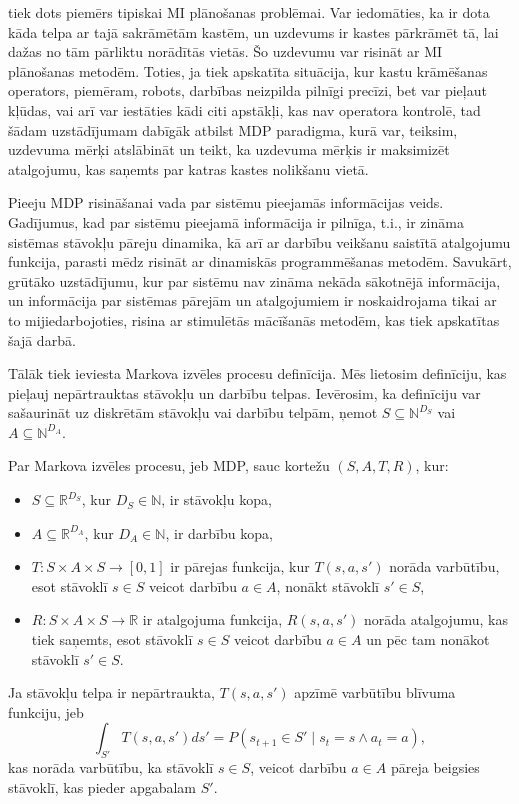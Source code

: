 \documentclass{ludis} %
\begin{document}
\autocite{Otterlo} tiek dots piemērs tipiskai MI plānošanas problēmai. Var iedomāties, ka ir dota kāda telpa ar tajā sakrāmētām kastēm, un uzdevums ir kastes pārkrāmēt tā, lai dažas no tām pārliktu norādītās vietās.
Šo uzdevumu var risināt ar MI plānošanas metodēm.
Toties, ja tiek apskatīta situācija, kur kastu krāmēšanas operators, piemēram, robots, darbības neizpilda pilnīgi precīzi, bet var pieļaut kļūdas, vai arī var iestāties kādi citi apstākļi, kas nav operatora kontrolē, tad šādam uzstādījumam dabīgāk atbilst MDP paradigma, kurā var, teiksim, uzdevuma mērķi atslābināt un teikt, ka uzdevuma mērķis ir maksimizēt atalgojumu, kas saņemts par katras kastes nolikšanu vietā.

Pieeju MDP risināšanai vada par sistēmu pieejamās informācijas veids.
Gadījumus, kad par sistēmu pieejamā informācija ir pilnīga, t.i., ir zināma sistēmas stāvokļu pāreju dinamika, kā arī ar darbību veikšanu saistītā atalgojumu funkcija, parasti mēdz risināt ar dinamiskās programmēšanas metodēm.
Savukārt, grūtāko uzstādījumu, kur par sistēmu nav zināma nekāda sākotnējā informācija, un informācija par sistēmas pārejām un atalgojumiem ir noskaidrojama tikai ar to mijiedarbojoties, risina ar stimulētās mācīšanās metodēm, kas tiek apskatītas šajā darbā.

Tālāk tiek ieviesta Markova izvēles procesu definīcija. Mēs lietosim definīciju, kas pieļauj nepārtrauktas stāvokļu un darbību telpas. Ievērosim, ka definīciju var sašaurināt uz diskrētām stāvokļu vai darbību telpām, ņemot $S \subseteq \mathbb{N}^{D_S}$ vai $A \subseteq \mathbb{N}^{D_A}$.

\begin{definicija}
Par Markova izvēles procesu, jeb MDP, sauc kortežu $(S, A, T, R)$, kur:
\begin{itemize}
	\item $S \subseteq \mathbb{R}^{D_S}$, kur $D_S \in \mathbb{N}$, ir stāvokļu kopa, %
	\item $A \subseteq \mathbb{R}^{D_A}$, kur $D_A \in \mathbb{N}$, ir darbību kopa, %
	\item $T:S \times A \times S \rightarrow [0,1]$ ir pārejas funkcija, kur $T(s, a, s')$ norāda varbūtību, esot stāvoklī $s \in S$ veicot darbību $a \in A$, nonākt stāvoklī $s' \in S$,
	\item $R:S \times A \times S \rightarrow \mathbb{R}$ ir atalgojuma funkcija, $R(s, a, s')$ norāda atalgojumu, kas tiek saņemts, esot stāvoklī $s \in S$ veicot darbību $a \in A$ un pēc tam nonākot stāvoklī $s' \in S$.
\end{itemize}
Ja stāvokļu telpa ir nepārtraukta, $T(s, a, s')$ apzīmē varbūtību blīvuma funkciju, jeb
\[
	\int_{S'} T(s, a, s')ds' = P(s_{t+1} \in S' \mid s_t = s \land a_t = a),
\]
kas norāda varbūtību, ka stāvoklī $s \in S$, veicot darbību $a \in A$ pāreja beigsies stāvoklī, kas pieder apgabalam $S'$. %
\end{definicija}
\end{document}
